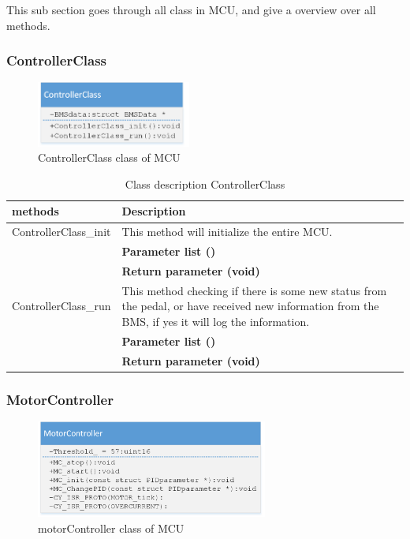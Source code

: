 This sub section goes through all class in MCU, and give a overview over all methods.
\subsubsection{ControllerClass}

\begin{figure}[H]
	\centering
	\includegraphics [width=2in]{Software/Pictures/class-diagram-controllerClass.png}
	\caption{ControllerClass class of MCU}
	\label{fig:Class_diagram_MCU_ControllerClass}
\end{figure}

\begin{table}[H]
	\centering
	\begin{tabular}{|p{5 cm}|p{10 cm}|}
		\hline
		\textbf{methods} & \textbf{Description} \\ \hline
		
		ControllerClass\_init
		& This method will initialize the entire MCU.
		\\ & \textbf{Parameter list ()}
		\\ & \textbf{Return parameter (void)}
		\\ \hline
		
		ControllerClass\_run
		& This method checking if there is some new status from the pedal, or have received new information from the BMS, if yes it will log the information. 
		\\ & \textbf{Parameter list ()}
		\\ & \textbf{Return parameter (void)}
		\\ \hline
		
	\end{tabular}
	\caption{Class description ControllerClass}
	\label{table:Class_description_ControllerClass_MCU}
\end{table}

\subsubsection{MotorController}

\begin{figure}[H]
	\centering
	\includegraphics [width=3in]{Software/Pictures/class-diagram-motorControllerClass.png}
	\caption{motorController class of MCU}
	\label{fig:Class_diagram_MCU_motorControllerClass}
\end{figure}

